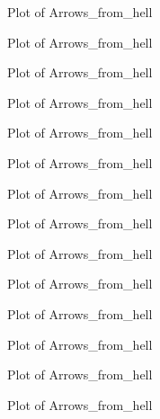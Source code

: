 
 \begin{figure}[htpb]
    \centering
    
    \caption{Plot of Arrows_from_hell}
    \label{fig:Arrows_from_hell}
 \end{figure}
 \begin{figure}[htpb]
    \centering
    
    \caption{Plot of Arrows_from_hell}
    \label{fig:Arrows_from_hell}
 \end{figure}
 \begin{figure}[htpb]
    \centering
    
    \caption{Plot of Arrows_from_hell}
    \label{fig:Arrows_from_hell}
 \end{figure}
 \begin{figure}[htpb]
    \centering
    
    \caption{Plot of Arrows_from_hell}
    \label{fig:Arrows_from_hell}
 \end{figure}
 \begin{figure}[htpb]
    \centering
    
    \caption{Plot of Arrows_from_hell}
    \label{fig:Arrows_from_hell}
 \end{figure}
 \begin{figure}[htpb]
    \centering
    
    \caption{Plot of Arrows_from_hell}
    \label{fig:Arrows_from_hell}
 \end{figure}
 \begin{figure}[htpb]
    \centering
    
    \caption{Plot of Arrows_from_hell}
    \label{fig:Arrows_from_hell}
 \end{figure}
 \begin{figure}[htpb]
    \centering
    
    \caption{Plot of Arrows_from_hell}
    \label{fig:Arrows_from_hell}
 \end{figure}
 \begin{figure}[htpb]
    \centering
    
    \caption{Plot of Arrows_from_hell}
    \label{fig:Arrows_from_hell}
 \end{figure}
 \begin{figure}[htpb]
    \centering
    
    \caption{Plot of Arrows_from_hell}
    \label{fig:Arrows_from_hell}
 \end{figure}
 \begin{figure}[htpb]
    \centering
    
    \caption{Plot of Arrows_from_hell}
    \label{fig:Arrows_from_hell}
 \end{figure}
 \begin{figure}[htpb]
    \centering
    
    \caption{Plot of Arrows_from_hell}
    \label{fig:Arrows_from_hell}
 \end{figure}
 \begin{figure}[htpb]
    \centering
    
    \caption{Plot of Arrows_from_hell}
    \label{fig:Arrows_from_hell}
 \end{figure}
 \begin{figure}[htpb]
    \centering
    
    \caption{Plot of Arrows_from_hell}
    \label{fig:Arrows_from_hell}
 \end{figure}